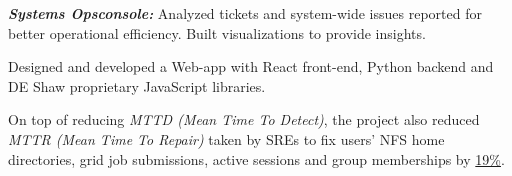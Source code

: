 \begin{cventries}
{\begin{cvitems}
{        }
        \vspace{0.1cm}
        \item {\textbf{\textit{Systems Opsconsole:}} Analyzed tickets and system-wide issues reported for better operational efficiency. Built visualizations to provide insights. 
        }
        \item {Designed and developed a Web-app with React front-end, Python backend and DE Shaw proprietary JavaScript libraries.
        }        
        \item {On top of reducing \textit{MTTD (Mean Time To Detect)}, the project also reduced \textit{MTTR (Mean Time To Repair)} taken by SREs to fix users' NFS home directories, grid job submissions, active sessions and group memberships by \underline{19\%}.
        }
        \vspace{-0.3cm}
      \end{cvitems}
    }
\end{cventries}

